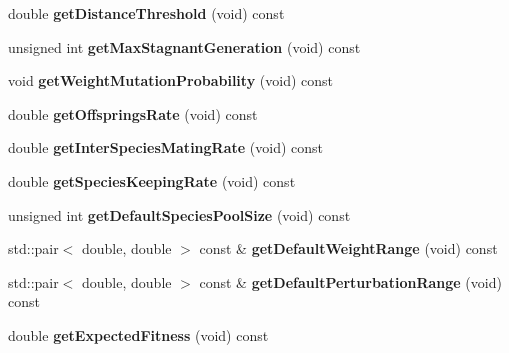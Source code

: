 \begin{DoxyCompactItemize}
double {\bfseries get\+Distance\+Threshold} (void) const
\item 
\mbox{\label{class_indie_neat_1_1_neat_engine_abc5e25d6aef01cf8b3e91b2a4de00264}} 
unsigned int {\bfseries get\+Max\+Stagnant\+Generation} (void) const
\item 
\mbox{\label{class_indie_neat_1_1_neat_engine_a5264ee8f3af5921c2c8273e11423ea8a}} 
void {\bfseries get\+Weight\+Mutation\+Probability} (void) const
\item 
\mbox{\label{class_indie_neat_1_1_neat_engine_a562a94a8fbe32faf3b320c6ec4ea0109}} 
double {\bfseries get\+Offsprings\+Rate} (void) const
\item 
\mbox{\label{class_indie_neat_1_1_neat_engine_affaf6d625464486cdadc03acb63ef5ff}} 
double {\bfseries get\+Inter\+Species\+Mating\+Rate} (void) const
\item 
\mbox{\label{class_indie_neat_1_1_neat_engine_ad0eff468394c3d6d676f24763592abcf}} 
double {\bfseries get\+Species\+Keeping\+Rate} (void) const
\item 
\mbox{\label{class_indie_neat_1_1_neat_engine_a043fe1693e0eec6a96409991fd23082d}} 
unsigned int {\bfseries get\+Default\+Species\+Pool\+Size} (void) const
\item 
\mbox{\label{class_indie_neat_1_1_neat_engine_a1d489dde2a8d01336f54d0863b295ebe}} 
std\+::pair$<$ double, double $>$ const  \& {\bfseries get\+Default\+Weight\+Range} (void) const
\item 
\mbox{\label{class_indie_neat_1_1_neat_engine_a1e7b1007365ba9478934f288fc001bd7}} 
std\+::pair$<$ double, double $>$ const  \& {\bfseries get\+Default\+Perturbation\+Range} (void) const
\item 
\mbox{\label{class_indie_neat_1_1_neat_engine_a826d58f8d3ba3f2527545969b4817e0e}} 
double {\bfseries get\+Expected\+Fitness} (void) const
\item 

\end{DoxyCompactItemize}

